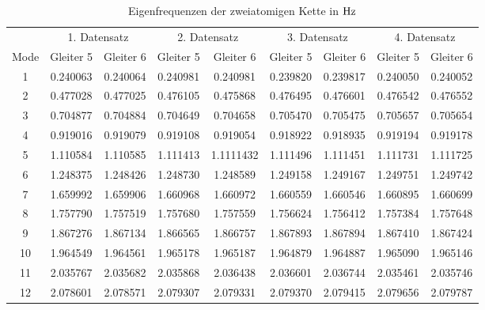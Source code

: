 \documentclass[a4paper,titlepage]{scrartcl}
\numberwithin{equation}{section}
\begin{document}
\begin{table}[H]
\centering
\tabcolsep=0.11cm
\begin{tabular}{ccccccccc}
\toprule
& \multicolumn{2}{c}{1. Datensatz} & \multicolumn{2}{c}{2. Datensatz} & \multicolumn{2}{c}{3. Datensatz} & \multicolumn{2}{c}{4. Datensatz}\\
\cmidrule(r){2-3} \cmidrule(r){4-5} \cmidrule(r){6-7} \cmidrule(r){8-9}
Mode & Gleiter 5 & Gleiter 6 & Gleiter 5 & Gleiter 6 & Gleiter 5 & Gleiter 6 & Gleiter 5 & Gleiter 6\\
\hline
1 & 0.240063 & 0.240064 & 0.240981 & 0.240981 & 0.239820 & 0.239817 & 0.240050 & 0.240052\\
2 & 0.477028 & 0.477025 & 0.476105 & 0.475868 & 0.476495 & 0.476601 & 0.476542 & 0.476552\\
3 & 0.704877 & 0.704884 & 0.704649 & 0.704658 & 0.705470 & 0.705475 & 0.705657 & 0.705654\\
4 & 0.919016 & 0.919079 & 0.919108 & 0.919054 & 0.918922 & 0.918935 & 0.919194 & 0.919178\\
5 & 1.110584 & 1.110585 & 1.111413 & 1.1111432 & 1.111496 & 1.111451 & 1.111731 & 1.111725\\
6 & 1.248375 & 1.248426 & 1.248730 & 1.248589 & 1.249158 & 1.249167 & 1.249751 & 1.249742\\
7 & 1.659992 & 1.659906 & 1.660968 & 1.660972 & 1.660559 & 1.660546 & 1.660895 & 1.660699\\
8 & 1.757790 & 1.757519 & 1.757680 & 1.757559 & 1.756624 & 1.756412 & 1.757384 & 1.757648\\
9 & 1.867276 & 1.867134 & 1.866565 & 1.866757 & 1.867893 & 1.867894 & 1.867410 & 1.867424\\
10 & 1.964549 & 1.964561 & 1.965178 & 1.965187 & 1.964879 & 1.964887 & 1.965090 & 1.965146\\
11 & 2.035767 & 2.035682 & 2.035868 & 2.036438 & 2.036601 & 2.036744 & 2.035461 & 2.035746\\
12 & 2.078601 & 2.078571 & 2.079307 & 2.079331 & 2.079370 & 2.079415 & 2.079656 & 2.079787\\
\bottomrule
\end{tabular}
\caption{Eigenfrequenzen der zweiatomigen Kette in $\unit[]{Hz}$}
\label{tab:eigenfreqZweiatom}
\end{table}
\end{document}
